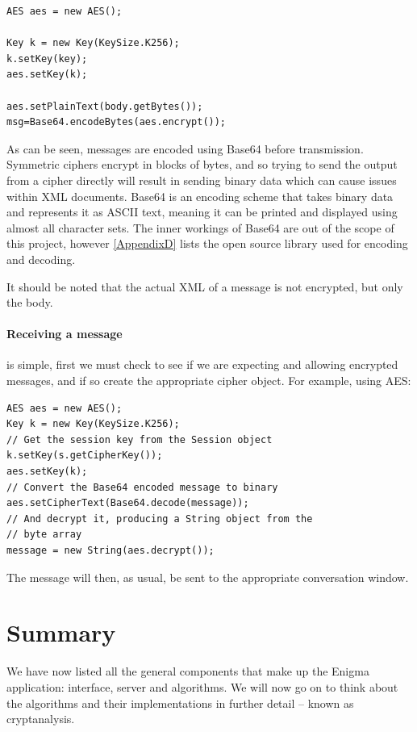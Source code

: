   \begin{lstlisting}
AES aes = new AES();
				
Key k = new Key(KeySize.K256);
k.setKey(key);
aes.setKey(k);
			
aes.setPlainText(body.getBytes());
msg=Base64.encodeBytes(aes.encrypt());
\end{lstlisting}

  As can be seen, messages are encoded using Base64 before transmission. Symmetric ciphers encrypt in blocks of bytes, and so trying to send the output from a cipher directly will result in sending binary data which can cause issues within XML documents. Base64 is an encoding scheme that takes binary data and represents it as ASCII text, meaning it can be printed and displayed using almost all character sets. The inner workings of Base64 are out of the scope of this project, however \textsection\ref{AppendixD} lists the open source library used for encoding and decoding.
  
  It should be noted that the actual XML of a message is not encrypted, but only the body.
  
  \paragraph{Receiving a message} is simple, first we must check to see if we are expecting and allowing encrypted messages, and if so create the appropriate cipher object. For example, using AES: \\
  
  \begin{lstlisting}
AES aes = new AES();
Key k = new Key(KeySize.K256);
// Get the session key from the Session object
k.setKey(s.getCipherKey());
aes.setKey(k);
// Convert the Base64 encoded message to binary
aes.setCipherText(Base64.decode(message));
// And decrypt it, producing a String object from the 
// byte array
message = new String(aes.decrypt());
\end{lstlisting}

  The message will then, as usual, be sent to the appropriate conversation window.

\section{Summary}

We have now listed all the general components that make up the Enigma application: interface, server and algorithms. We will now go on to think about the algorithms and their implementations in further detail -- known as cryptanalysis.

